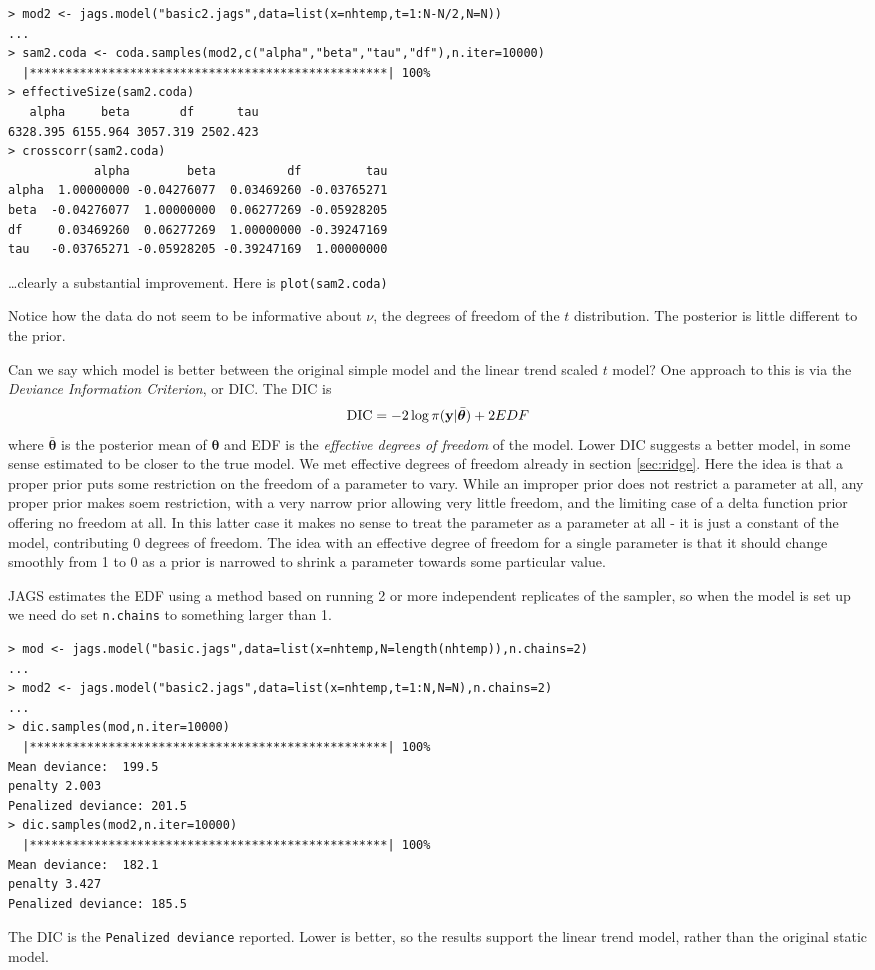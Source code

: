 \documentclass[10pt] {article}
\newcommand{\eps}[3]
{{\begin{center}
 \rotatebox{#1}{\scalebox{#2}{\texttt{[image: \#3]}}}
 \end{center}}
}
\theoremstyle{definition}
\begin{document}
\begin{lstlisting}
> mod2 <- jags.model("basic2.jags",data=list(x=nhtemp,t=1:N-N/2,N=N))
...
> sam2.coda <- coda.samples(mod2,c("alpha","beta","tau","df"),n.iter=10000)
  |**************************************************| 100%
> effectiveSize(sam2.coda)
   alpha     beta       df      tau 
6328.395 6155.964 3057.319 2502.423 
> crosscorr(sam2.coda)
            alpha        beta          df         tau
alpha  1.00000000 -0.04276077  0.03469260 -0.03765271
beta  -0.04276077  1.00000000  0.06277269 -0.05928205
df     0.03469260  0.06277269  1.00000000 -0.39247169
tau   -0.03765271 -0.05928205 -0.39247169  1.00000000
\end{lstlisting}
\ldots clearly a substantial improvement. Here is \lstinline+plot(sam2.coda)+
\eps{-90}{.5}{nht-trace2.eps}
\noindent Notice how the data do not seem to be informative about $\nu$, the degrees of freedom of the $t$ distribution. The posterior is little different to the prior.  
 
Can we say which model is better between the original simple model and the linear trend scaled $t $ model? One approach to this is via the {\em Deviance Information Criterion}, or DIC. The DIC is 
$$
\text{DIC} = - 2 \log \pi({\bf y}|\bar {\bm \theta}) + 2 EDF
$$ 
where $\bar {\bm \theta}$ is the posterior mean of $\bm \theta$ and EDF is the {\em effective degrees of freedom} of the model. Lower DIC suggests a better model, in some sense estimated to be closer to the true model. We met effective degrees of freedom already in section \ref{sec:ridge}.  Here the idea is that a proper prior puts some restriction on the freedom of a parameter to vary. While an improper prior does not restrict a parameter at all, any proper prior makes soem restriction, with a very narrow prior allowing very little freedom, and the limiting case of a delta function prior offering no freedom at all. In this latter case it makes no sense to treat the parameter as a parameter at all - it is just a constant of the model, contributing 0 degrees of freedom. The idea with an effective degree of freedom for a single parameter is that it should change smoothly from 1 to 0 as a prior is narrowed to shrink a parameter towards some particular value. 

JAGS estimates the EDF using a method based on running 2 or more independent replicates of the sampler, so when the model is set up we need do set {\tt n.chains} to something larger than 1.
\begin{lstlisting}
> mod <- jags.model("basic.jags",data=list(x=nhtemp,N=length(nhtemp)),n.chains=2)
...
> mod2 <- jags.model("basic2.jags",data=list(x=nhtemp,t=1:N,N=N),n.chains=2)
...
> dic.samples(mod,n.iter=10000)
  |**************************************************| 100%
Mean deviance:  199.5 
penalty 2.003 
Penalized deviance: 201.5 
> dic.samples(mod2,n.iter=10000)
  |**************************************************| 100%
Mean deviance:  182.1 
penalty 3.427 
Penalized deviance: 185.5 
\end{lstlisting}
The DIC is the {\tt Penalized deviance} reported. Lower is better, so the results support the linear trend model, rather than the original static model.
\end{document}

